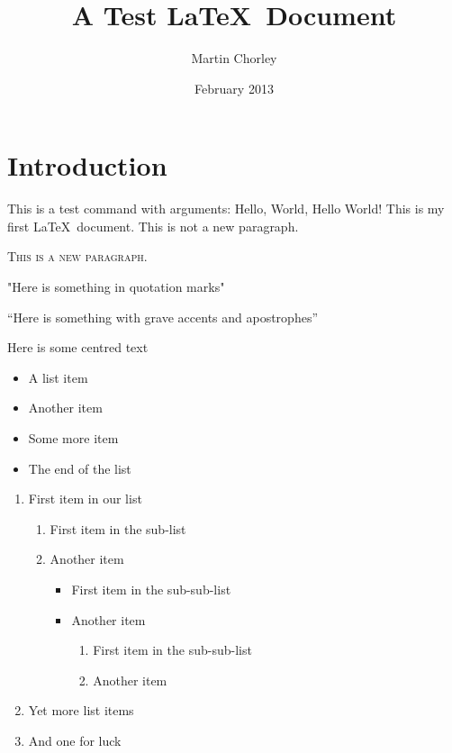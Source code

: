 \documentclass[12pt,twoside,a4paper]{article}
\title{A Test \LaTeX\ Document}
\author{Martin Chorley}
\date{February 2013}
\newcommand{\testcmd}[3]{This is a test command with arguments: #1, #2, #3}
\begin{document}
\maketitle

\begin{abstract}
\lipsum[2]
\end{abstract}

\section*{Introduction}

\testcmd{Hello}{World}

\onehalfspacing
{\Huge Hello World!} This is       my       first       \LaTeX\     document.
This is not a new paragraph.

\textsc{This is a new paragraph.}

"Here is something in quotation marks"

``Here is something with grave accents and apostrophes''

\begin{center}{\tiny Here is some centred text}\end{center}

\begin{itemize}
	\item A list item
	\item Another item
	\item Some more item
	\item The end of the list
\end{itemize}

\begin{enumerate}
	\item First item in our list
		\begin{enumerate}
			\item First item in the sub-list
			\item Another item
					\begin{itemize}
						\item First item in the sub-sub-list
						\item Another item
							\begin{enumerate}
								\item First item in the sub-sub-list
								\item Another item
							\end{enumerate}
					\end{itemize}
		\end{enumerate}
	\item Yet more list items
	\item And one for luck
\end{enumerate}
\end{document}
